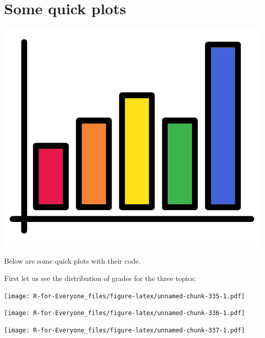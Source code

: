 \documentclass[]{book}
\newenvironment{Shaded}{\begin{snugshade}}{\end{snugshade}}
\newcommand{\KeywordTok}[1]{\textcolor[rgb]{0.13,0.29,0.53}{\textbf{#1}}}
\newcommand{\CommentTok}[1]{\textcolor[rgb]{0.56,0.35,0.01}{\textit{#1}}}
\newcommand{\OperatorTok}[1]{\textcolor[rgb]{0.81,0.36,0.00}{\textbf{#1}}}
\newcommand{\NormalTok}[1]{#1}
\begin{document}
\section{Some quick plots}\label{some-quick-plots}

\begin{center}\includegraphics[width=0.2\linewidth]{figures/bar_chart} \end{center}

Below are some quick plots with their code.

First let us see the distribution of grades for the three topics:

\begin{Shaded}
\end{Shaded}

\texttt{[image: R-for-Everyone\_files/figure-latex/unnamed-chunk-335-1.pdf]}

\begin{Shaded}
\end{Shaded}

\texttt{[image: R-for-Everyone\_files/figure-latex/unnamed-chunk-336-1.pdf]}

\begin{Shaded}
\end{Shaded}

\texttt{[image: R-for-Everyone\_files/figure-latex/unnamed-chunk-337-1.pdf]}

\begin{Shaded}
\end{Shaded}
\end{document}
